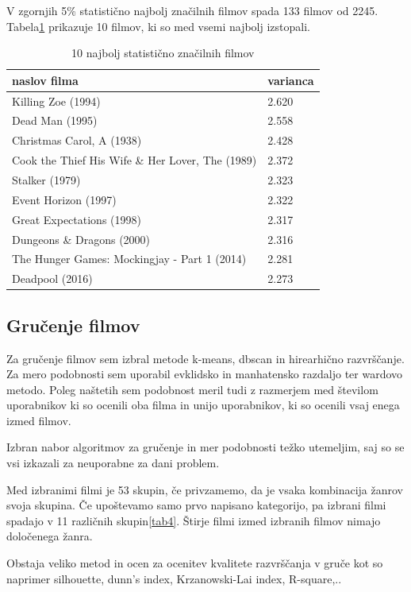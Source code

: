 \documentclass[a4paper,11pt]{article}
\begin{document}
V zgornjih 5\% statistično najbolj značilnih filmov spada 133 filmov od 2245. Tabela\ref{tab3} prikazuje 10 filmov, ki so med vsemi najbolj izstopali.


\begin{table}[htbp]
\caption{10 najbolj statistično značilnih filmov}
\label{tab3}
\begin{center}
\begin{tabular}{lp{2cm}}
\hline
naslov filma & varianca \\
\hline
Killing Zoe (1994) & 2.620\\
Dead Man (1995) & 2.558 \\
Christmas Carol, A (1938) & 2.428\\
Cook the Thief His Wife \& Her Lover, The (1989) & 2.372 \\
Stalker (1979) & 2.323\\
Event Horizon (1997) & 2.322 \\
Great Expectations (1998) & 2.317 \\
Dungeons \& Dragons (2000) & 2.316 \\
The Hunger Games: Mockingjay - Part 1 (2014) & 2.281 \\
Deadpool (2016) & 2.273 \\
\hline
\end{tabular}
\end{center}
\end{table}

\subsection{Gručenje filmov}
Za gručenje filmov sem izbral metode k-means, dbscan in hirearhično razvrščanje. Za mero podobnosti sem uporabil evklidsko in manhatensko razdaljo ter wardovo metodo. Poleg naštetih sem podobnost meril tudi z razmerjem med številom uporabnikov ki so ocenili oba filma in unijo uporabnikov, ki so ocenili vsaj enega izmed filmov.

Izbran nabor algoritmov za gručenje in mer podobnosti težko utemeljim, saj so se vsi izkazali za neuporabne za dani problem.

Med izbranimi filmi je 53 skupin, če privzamemo, da je vsaka kombinacija žanrov svoja skupina. Če upoštevamo samo prvo napisano kategorijo, pa izbrani filmi spadajo v 11 različnih skupin\ref{tab4}. Štirje filmi izmed izbranih filmov nimajo določenega žanra.

Obstaja veliko metod in ocen za ocenitev kvalitete razvrščanja v gruče kot so naprimer silhouette, dunn's index, Krzanowski-Lai index, R-square,..
\end{document}
